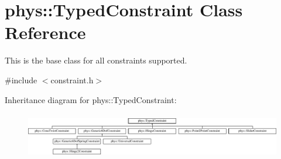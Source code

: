 \hypertarget{classphys_1_1TypedConstraint}{
\section{phys::TypedConstraint Class Reference}
\label{d1/d17/classphys_1_1TypedConstraint}
}


This is the base class for all constraints supported.  




{\ttfamily \#include $<$constraint.h$>$}

Inheritance diagram for phys::TypedConstraint:\begin{figure}[H]
\begin{center}
\leavevmode
\includegraphics[height=2.04566cm]{d1/d17/classphys_1_1TypedConstraint}
\end{center}
\end{figure}
